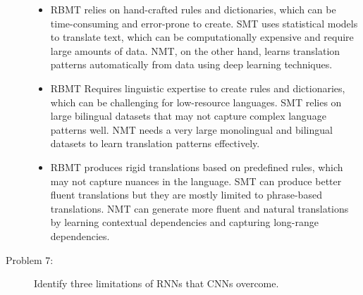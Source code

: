 \documentclass[10pt]{article}
\begin{document}
\begin{description}
\begin{itemize}
    \item RBMT relies on hand-crafted rules and dictionaries, which can be time-consuming and error-prone to create.
    SMT uses statistical models to translate text, which can be computationally expensive and require large amounts of data.
    NMT, on the other hand, learns translation patterns automatically from data using deep learning techniques.
    \item RBMT Requires linguistic expertise to create rules and dictionaries, which can be challenging for low-resource languages.
    SMT relies on large bilingual datasets that may not capture complex language patterns well.
    NMT needs a very large monolingual and bilingual datasets to learn translation patterns effectively.
    \item RBMT produces rigid translations based on predefined rules, which may not capture nuances in the language.
    SMT can produce better fluent translations but they are mostly limited to phrase-based translations.
    NMT can generate more fluent and natural translations by learning contextual dependencies and capturing long-range dependencies.
\end{itemize}

\pagebreak

\item[Problem 7:] \hfill Identify three limitations of RNNs that CNNs overcome.

\end{description}
\end{document}

